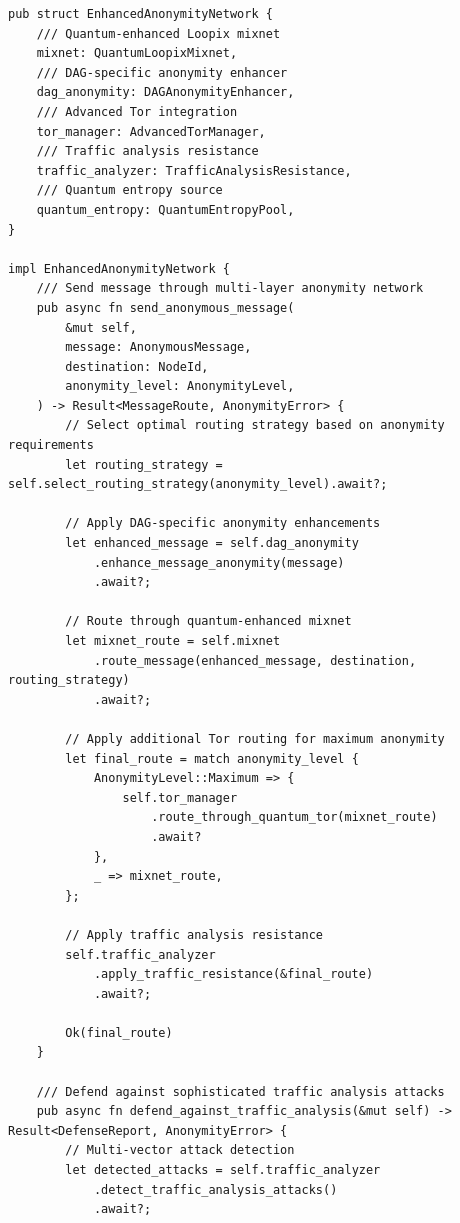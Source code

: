 \documentclass[12pt,a4paper]{article}
\begin{document}
\begin{lstlisting}[style=rustcode, caption=Enhanced Anonymity Network]
pub struct EnhancedAnonymityNetwork {
    /// Quantum-enhanced Loopix mixnet
    mixnet: QuantumLoopixMixnet,
    /// DAG-specific anonymity enhancer
    dag_anonymity: DAGAnonymityEnhancer,
    /// Advanced Tor integration
    tor_manager: AdvancedTorManager,
    /// Traffic analysis resistance
    traffic_analyzer: TrafficAnalysisResistance,
    /// Quantum entropy source
    quantum_entropy: QuantumEntropyPool,
}

impl EnhancedAnonymityNetwork {
    /// Send message through multi-layer anonymity network
    pub async fn send_anonymous_message(
        &mut self,
        message: AnonymousMessage,
        destination: NodeId,
        anonymity_level: AnonymityLevel,
    ) -> Result<MessageRoute, AnonymityError> {
        // Select optimal routing strategy based on anonymity requirements
        let routing_strategy = self.select_routing_strategy(anonymity_level).await?;
        
        // Apply DAG-specific anonymity enhancements
        let enhanced_message = self.dag_anonymity
            .enhance_message_anonymity(message)
            .await?;
        
        // Route through quantum-enhanced mixnet
        let mixnet_route = self.mixnet
            .route_message(enhanced_message, destination, routing_strategy)
            .await?;
        
        // Apply additional Tor routing for maximum anonymity
        let final_route = match anonymity_level {
            AnonymityLevel::Maximum => {
                self.tor_manager
                    .route_through_quantum_tor(mixnet_route)
                    .await?
            },
            _ => mixnet_route,
        };
        
        // Apply traffic analysis resistance
        self.traffic_analyzer
            .apply_traffic_resistance(&final_route)
            .await?;
        
        Ok(final_route)
    }
    
    /// Defend against sophisticated traffic analysis attacks
    pub async fn defend_against_traffic_analysis(&mut self) -> Result<DefenseReport, AnonymityError> {
        // Multi-vector attack detection
        let detected_attacks = self.traffic_analyzer
            .detect_traffic_analysis_attacks()
            .await?;
        

\end{lstlisting}
\end{document}
